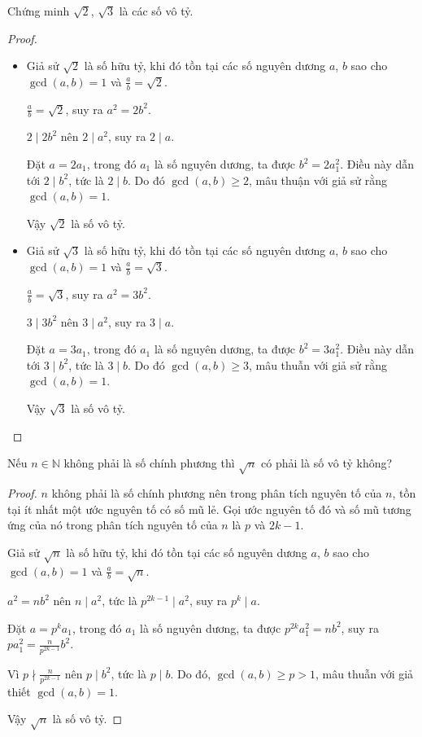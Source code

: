 \documentclass[class=analysis,crop=false]{standalone}
\begin{document}
\begin{exercise}
    Chứng minh $\sqrt{2}$, $\sqrt{3}$ là các số vô tỷ.
\end{exercise}

\begin{proof}
    \begin{itemize}
        \item Giả sử $\sqrt{2}$ là số hữu tỷ, khi đó tồn tại các số nguyên dương $a$, $b$ sao cho $\gcd(a,b) = 1$ và $\frac{a}{b} = \sqrt{2}$.
              \par $\frac{a}{b} = \sqrt{2}$, suy ra $a^{2} = 2b^{2}$.
              \par $2\mid 2b^{2}$ nên $2\mid a^{2}$, suy ra $2\mid a$.
              \par Đặt $a = 2a_{1}$, trong đó $a_{1}$ là số nguyên dương, ta được $b^{2} = 2a^{2}_{1}$. Điều này dẫn tới $2\mid b^{2}$, tức là $2\mid b$. Do đó $\gcd(a, b)\ge 2$, mâu thuận với giả sử rằng $\gcd(a, b) = 1$.
              \par Vậy $\sqrt{2}$ là số vô tỷ.
        \item Giả sử $\sqrt{3}$ là số hữu tỷ, khi đó tồn tại các số nguyên dương $a$, $b$ sao cho $\gcd(a,b) = 1$ và $\frac{a}{b} = \sqrt{3}$.
              \par $\frac{a}{b} = \sqrt{3}$, suy ra $a^{2} = 3b^{2}$.
              \par $3\mid 3b^{2}$ nên $3\mid a^{2}$, suy ra $3\mid a$.
              \par Đặt $a = 3a_{1}$, trong đó $a_{1}$ là số nguyên dương, ta được $b^{2} = 3a^{2}_{1}$. Điều này dẫn tới $3\mid b^{2}$, tức là $3\mid b$. Do đó $\gcd(a, b)\ge 3$, mâu thuẫn với giả sử rằng $\gcd(a, b) = 1$.
              \par Vậy $\sqrt{3}$ là số vô tỷ.
    \end{itemize}
\end{proof}

\begin{exercise}
    Nếu $n\in\mathbb{N}$ không phải là số chính phương thì $\sqrt{n}$ có phải là số vô tỷ không?
\end{exercise}

\begin{proof}
    $n$ không phải là số chính phương nên trong phân tích nguyên tố của $n$, tồn tại ít nhất một ước nguyên tố có số mũ lẻ. Gọi ước nguyên tố đó và số mũ tương ứng của nó trong phân tích nguyên tố của $n$ là $p$ và $2k - 1$.
    \bigskip
    \par Giả sử $\sqrt{n}$ là số hữu tỷ, khi đó tồn tại các số nguyên dương $a$, $b$ sao cho $\gcd(a,b) = 1$ và $\frac{a}{b} = \sqrt{n}$.
    \par $a^{2} = nb^{2}$ nên $n\mid a^{2}$, tức là $p^{2k-1}\mid a^{2}$, suy ra $p^{k}\mid a$.
    \par Đặt $a = p^{k}a_{1}$, trong đó $a_{1}$ là số nguyên dương, ta được $p^{2k}a^{2}_{1} = nb^{2}$, suy ra $pa^{2}_{1} = \frac{n}{p^{2k-1}}b^{2}$.
    \par Vì $p\nmid \frac{n}{p^{2k-1}}$ nên $p\mid b^{2}$, tức là $p\mid b$. Do đó, $\gcd(a,b)\ge p > 1$, mâu thuẫn với giả thiết $\gcd(a,b) = 1$.
    \par Vậy $\sqrt{n}$ là số vô tỷ.
\end{proof}
\end{document}
